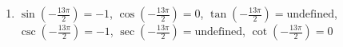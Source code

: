 \begin{enumerate}
    \item $\sin\left(-\frac{13\pi}{2}\right) = -1$, 
        $\cos\left(-\frac{13\pi}{2}\right) = 0$, 
        $\tan\left(-\frac{13\pi}{2}\right) = \text{undefined}$, 
        $\csc\left(-\frac{13\pi}{2}\right) = -1$, 
        $\sec\left(-\frac{13\pi}{2}\right) = \text{undefined}$, 
        $\cot\left(-\frac{13\pi}{2}\right) = 0$
    
    
\end{enumerate}